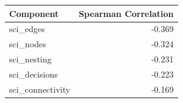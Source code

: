 \begin{tabular}{lr}
\toprule
Component & Spearman Correlation \\
\midrule
sci_edges & -0.369 \\
sci_nodes & -0.324 \\
sci_nesting & -0.231 \\
sci_decisions & -0.223 \\
sci_connectivity & -0.169 \\
\bottomrule
\end{tabular}
